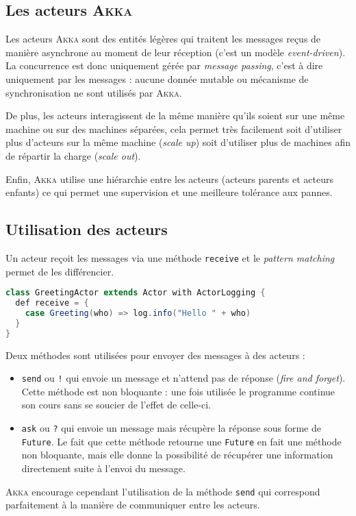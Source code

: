 \documentclass[11pt,a4paper]{article}
\begin{document}
\subsection{Les acteurs \textsc{Akka}}
Les acteurs \textsc{Akka} sont des entités légères qui traitent les messages reçus de manière asynchrone au moment de leur réception (c'est un modèle \textit{event-driven}). La concurrence est donc uniquement gérée par \textit{message passing}, c'est à dire uniquement par les messages : aucune donnée mutable ou mécanisme de synchronisation ne sont utilisés par \textsc{Akka}. 

De plus, les acteurs interagissent de la même manière qu'ils soient sur une même machine ou sur des machines séparées, cela permet très facilement soit d'utiliser plus d'acteurs sur la même machine (\textit{scale up}) soit d'utiliser plus de machines afin de répartir la charge (\textit{scale out}).

Enfin, \textsc{Akka} utilise une hiérarchie entre les acteurs (acteurs parents et acteurs enfants) ce qui permet une supervision et une meilleure tolérance aux pannes.

\subsection{Utilisation des acteurs}
Un acteur reçoit les messages via une méthode \texttt{receive} et le \textit{pattern matching} permet de les différencier.
\begin{lstlisting}[language = java]
class GreetingActor extends Actor with ActorLogging {
  def receive = {
	case Greeting(who) => log.info("Hello " + who)
  }
}
\end{lstlisting}

Deux méthodes sont utilisées pour envoyer des messages à des acteurs : 
\begin{itemize}
\item \texttt{send} ou \texttt{!} qui envoie un message et n'attend pas de réponse (\textit{fire and forget}). Cette méthode est non bloquante : une fois utilisée le programme continue son cours sans se soucier de l'effet de celle-ci.
\item \texttt{ask} ou \texttt{?} qui envoie un message mais récupère la réponse sous forme de \texttt{Future}. Le fait que cette méthode retourne une \texttt{Future} en fait une méthode non bloquante, mais elle donne la possibilité de récupérer une information directement suite à l'envoi du message.\\
\end{itemize}

\textsc{Akka} encourage cependant l'utilisation de la méthode \texttt{send} qui correspond parfaitement à la manière de communiquer entre les acteurs.

\nocite{*}
{}
\end{document}
